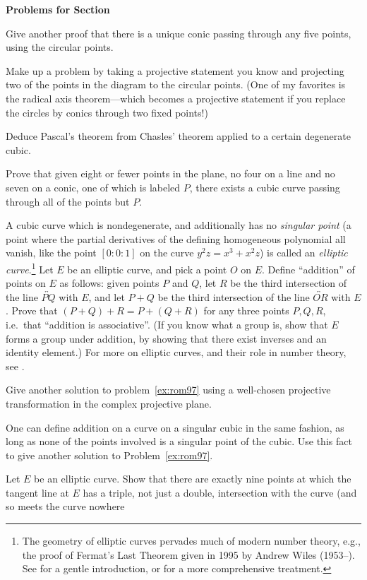 \documentclass[12pt]{book}
\newcounter{exc}
\numberwithin{exc}{section}
\numberwithin{figure}{section}
\newenvironment{exer}{\vspace{0.1in}
\noindent \textbf{Problems for Section~\thesection} \vspace{0.1in}
\begin{list}{\arabic{exc}.}{\usecounter{exc}}}{\end{list}}
\numberwithin{equation}{theorem}
\def\ii{\item}
\def\line#1{\overleftrightarrow{#1}}
\begin{document}
\begin{exer}
\ii
Give another proof that there is a unique conic passing through any 
five points, using the circular points.
\ii
Make up a problem by taking a projective statement you know and 
projecting two of the points in the diagram to the circular points. 
(One of my favorites is the radical axis theorem---which becomes a 
projective statement if you replace the circles by conics through two 
fixed points!)
\ii 
Deduce Pascal's theorem from Chasles' theorem applied to a certain
degenerate cubic.
\ii \label{ex:chas}
Prove that given eight or fewer points in the plane, no four on a line and no 
seven on a conic, one of which is labeled $P$,
there exists a cubic curve passing through all of the points but $P$.
\ii
A cubic curve which is nondegenerate, and additionally has no 
\emph{singular point} (a point where the partial derivatives of the 
defining homogeneous polynomial all vanish, like the point $[0:0:1]$ 
on the curve $y^2z = x^3+x^2z$) is called an \emph{elliptic 
curve}.\footnote{The geometry of elliptic curves pervades much of
modern number theory, e.g., the proof of Fermat's Last Theorem 
given in 1995 by Andrew Wiles (1953--). 
See \cite{bib:st} for a
gentle introduction, or \cite{bib:silverman} for a more comprehensive
treatment.} 
Let $E$ be an elliptic curve, and pick a point $O$ on $E$. 
Define ``addition'' of points on $E$ as follows: 
given points $P$ and 
$Q$, let $R$ be the third intersection of the line $\line{PQ}$ with $E$, and 
let $P+Q$ be the third intersection of the line $\line{OR}$ with $E$. Prove 
that $(P+Q)+R = P+(Q+R)$ for any three points $P,Q,R$, i.e.\ that 
``addition is associative''. (If you know what a group is, show that 
$E$ forms a group under addition, by showing that there exist
inverses and an identity element.)
For more on elliptic curves, and their role 
in number theory, see \cite{bib:st}.
\ii \label{ex:rom97a}
Give another solution to problem~\ref{ex:rom97} using a well-chosen
projective transformation in the complex projective plane.
\ii
One can define addition on a curve on a singular cubic in the same
fashion, as long as none of the points involved is a singular point of
the cubic. Use this fact to
give another solution to Problem~\ref{ex:rom97}.
\ii \label{ex:flex}
Let $E$ be an elliptic curve. Show that there are exactly 
nine points at which the tangent line at $E$ has a triple, not just a 
double, intersection with the curve (and so meets the curve nowhere 

\end{exer}
\end{document}
